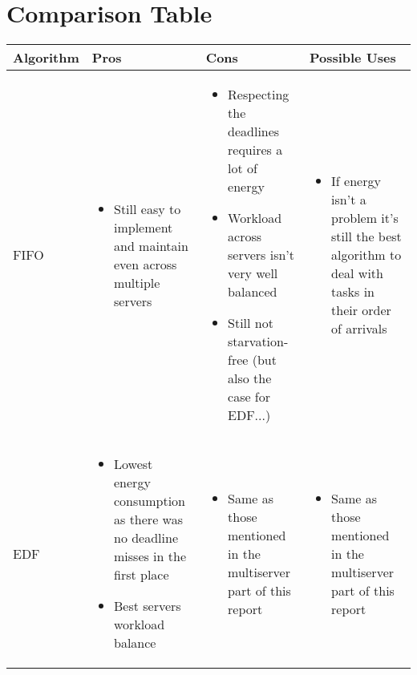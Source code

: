 \documentclass[./report.tex]{subfiles}
\begin{document}
\newpage
\section{Comparison Table}

\begin{tabular}{|m{8em}|m{12em}|m{12em}|m{12em}|} 
	\hline 
	\textbf{Algorithm} & \textbf{Pros} & \textbf{Cons} & \textbf{Possible Uses} \\ 
	\hline
	FIFO 
	&  
	\begin{itemize}[leftmargin=*]
		\item Still easy to implement and maintain even across multiple servers
	\end{itemize}
	&  
	\begin{itemize}[leftmargin=*]
		\item Respecting the deadlines requires a lot of energy
		\item Workload across servers isn't very well balanced
		\item Still not starvation-free (but also the case for EDF...)
	\end{itemize}
	& 
	\begin{itemize}[leftmargin=*]
		\item If energy isn't a problem it's still the best algorithm to deal with tasks in their order of arrivals
	\end{itemize}
	\\
	\hline
	EDF 
	&  
	\begin{itemize}[leftmargin=*]
		\item Lowest energy consumption as there was no deadline misses in the first place
		\item Best servers workload balance
	\end{itemize}
	&  
	\begin{itemize}[leftmargin=*]
		\item Same as those mentioned in the multiserver part of this report
	\end{itemize}
	& 
	\begin{itemize}[leftmargin=*]
		\item Same as those mentioned in the multiserver part of this report
	\end{itemize}
	\\
	\hline
\end{tabular}
\end{document}
